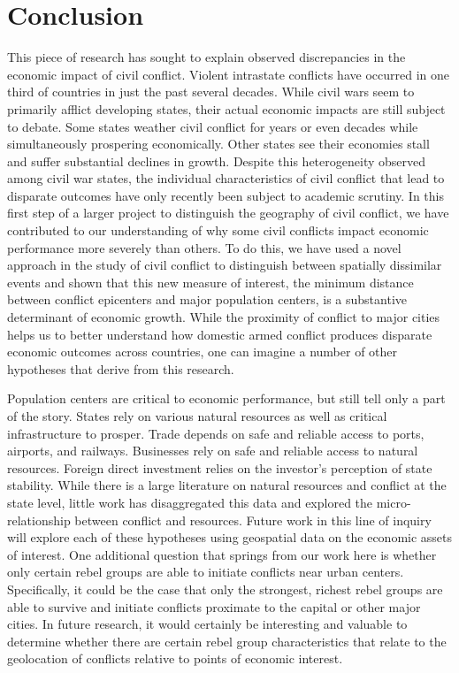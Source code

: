 
\section{Conclusion}
\label{conclusion}

This piece of research has sought to explain observed discrepancies in the economic impact of civil conflict. Violent intrastate conflicts have occurred in one third of countries in just the past several decades. While civil wars seem to primarily afflict developing states, their actual economic impacts are still subject to debate. Some states weather civil conflict for years or even decades while simultaneously prospering economically. Other states see their economies stall and suffer substantial declines in growth. Despite this heterogeneity observed among civil war states, the individual characteristics of civil conflict that lead to disparate outcomes have only recently been subject to academic scrutiny. In this first step of a larger project to distinguish the geography of civil conflict, we have contributed to our understanding of why some civil conflicts impact economic performance more severely than others. To do this, we have used a novel approach in the study of civil conflict to distinguish between spatially dissimilar events and shown that this new measure of interest, the minimum distance between conflict epicenters and major population centers, is a substantive determinant of economic growth. While the proximity of conflict to major cities helps us to better understand how domestic armed conflict produces disparate economic outcomes across countries, one can imagine a number of other hypotheses that derive from this research.

Population centers are critical to economic performance, but still tell only a part of the story. States rely on various natural resources as well as critical infrastructure to prosper. Trade depends on safe and reliable access to ports, airports, and railways. Businesses rely on safe and reliable access to natural resources. Foreign direct investment relies on the investor's perception of state stability. While there is a large literature on natural resources and conflict at the state level, little work has disaggregated this data and explored the micro-relationship between conflict and resources. Future work in this line of inquiry will explore each of these hypotheses using geospatial data on the economic assets of interest. One additional question that springs from our work here is whether only certain rebel groups are able to initiate conflicts near urban centers. Specifically, it could be the case that only the strongest, richest rebel groups are able to survive and initiate conflicts proximate to the capital or other major cities. In future research, it would certainly be interesting and valuable to determine whether there are certain rebel group characteristics that relate to the geolocation of conflicts relative to points of economic interest.

